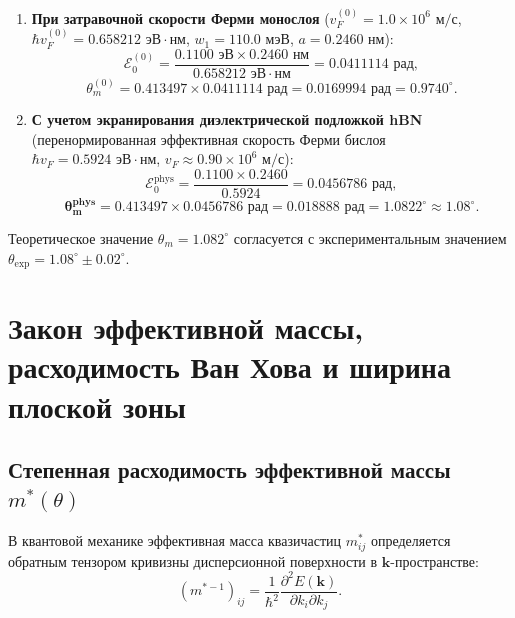 \documentclass[12pt,a4paper]{article}
\begin{document}
	\begin{enumerate}
		\item \textbf{При затравочной скорости Ферми монослоя} ($v_F^{(0)} = 1.0 \times 10^6\text{ м/с}$, $\hbar v_F^{(0)} = 0.658212\text{ эВ}\cdot\text{нм}$, $w_1 = 110.0\text{ мэВ}$, $a = 0.2460\text{ нм}$):
		\begin{equation}
			\mathcal{E}_0^{(0)} = \frac{0.1100\text{ эВ} \times 0.2460\text{ нм}}{0.658212\text{ эВ}\cdot\text{нм}} = \mathbf{0.0411114\text{ рад}},
		\end{equation}
		\begin{equation}
			\theta_m^{(0)} = 0.413497 \times 0.0411114\text{ рад} = \mathbf{0.0169994\text{ рад}} = \mathbf{0.9740^\circ}.
		\end{equation}
		
		\item \textbf{С учетом экранирования диэлектрической подложкой hBN} (перенормированная эффективная скорость Ферми бислоя $\hbar v_F = 0.5924\text{ эВ}\cdot\text{нм}$, $v_F \approx 0.90 \times 10^6\text{ м/с}$):
		\begin{equation}
			\mathcal{E}_0^{\text{phys}} = \frac{0.1100 \times 0.2460}{0.5924} = \mathbf{0.0456786\text{ рад}},
		\end{equation}
		\begin{equation}
			\mathbf{\theta_m^{\text{phys}} = 0.413497 \times 0.0456786\text{ рад} = \mathbf{0.018888\text{ рад}} = \mathbf{1.0822^\circ} \approx \mathbf{1.08^\circ}}.
		\end{equation}
	\end{enumerate}
	Теоретическое значение $\theta_m = 1.082^\circ$ согласуется с экспериментальным значением $\theta_{\text{exp}} = 1.08^\circ \pm 0.02^\circ$.
\section{Закон эффективной массы, расходимость Ван Хова и ширина плоской зоны}

\subsection{Степенная расходимость эффективной массы $m^*(\theta)$}
В квантовой механике эффективная масса квазичастиц $m_{ij}^*$ определяется обратным тензором кривизны дисперсионной поверхности в $\mathbf{k}$-пространстве:
\begin{equation}
	(m^{*-1})_{ij} = \frac{1}{\hbar^2} \frac{\partial^2 E(\mathbf{k})}{\partial k_i \partial k_j}.
\end{equation}
\end{document}
